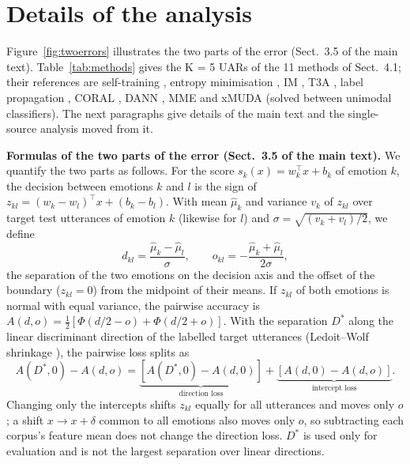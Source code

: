 \documentclass[sn-nature,pdflatex]{sn-jnl}
\begin{document}
\section{Details of the analysis}\label{sec:s2}
Figure~\ref{fig:twoerrors} illustrates the two parts of the error (Sect.~3.5 of the main text). Table~\ref{tab:methods} gives the K = 5 UARs of the 11 methods of Sect.~4.1; their references are self-training \cite{lee2013pseudolabel}, entropy minimisation \cite{grandvalet2004}, IM \cite{liang2020,boudiaf2020}, T3A \cite{iwasawa2021}, label propagation \cite{zhou2004,iscen2019}, CORAL \cite{sun2016coral}, DANN \cite{ganin2016dann}, MME \cite{saito2019mme} and xMUDA \cite{jaritz2020xmuda} (solved between unimodal classifiers). The next paragraphs give details of the main text and the single-source analysis moved from it.

\textbf{Formulas of the two parts of the error (Sect.~3.5 of the main text).} We quantify the two parts as follows. For the score $s_k(x)=w_k^\top x+b_k$ of emotion $k$, the decision between emotions $k$ and $l$ is the sign of $z_{kl}=(w_k-w_l)^\top x+(b_k-b_l)$. With mean $\hat\mu_k$ and variance $v_k$ of $z_{kl}$ over target test utterances of emotion $k$ (likewise for $l$) and $\sigma=\sqrt{(v_k+v_l)/2}$, we define
\begin{equation}
d_{kl}=\frac{\hat\mu_k-\hat\mu_l}{\sigma},\qquad o_{kl}=-\frac{\hat\mu_k+\hat\mu_l}{2\sigma},
\end{equation}
the separation of the two emotions on the decision axis and the offset of the boundary ($z_{kl}=0$) from the midpoint of their means. If $z_{kl}$ of both emotions is normal with equal variance, the pairwise accuracy is $A(d,o)=\tfrac12[\Phi(d/2-o)+\Phi(d/2+o)]$. With the separation $D^{*}$ along the linear discriminant direction of the labelled target utterances (Ledoit--Wolf shrinkage \cite{ledoit2004}), the pairwise loss splits as
\begin{equation}
A(D^{*},0)-A(d,o)=\underbrace{[A(D^{*},0)-A(d,0)]}_{\text{direction loss}}+\underbrace{[A(d,0)-A(d,o)]}_{\text{intercept loss}}.
\end{equation}
Changing only the intercepts shifts $z_{kl}$ equally for all utterances and moves only $o$; a shift $x\to x+\delta$ common to all emotions also moves only $o$, so subtracting each corpus's feature mean does not change the direction loss. $D^{*}$ is used only for evaluation and is not the largest separation over linear directions.
\end{document}
